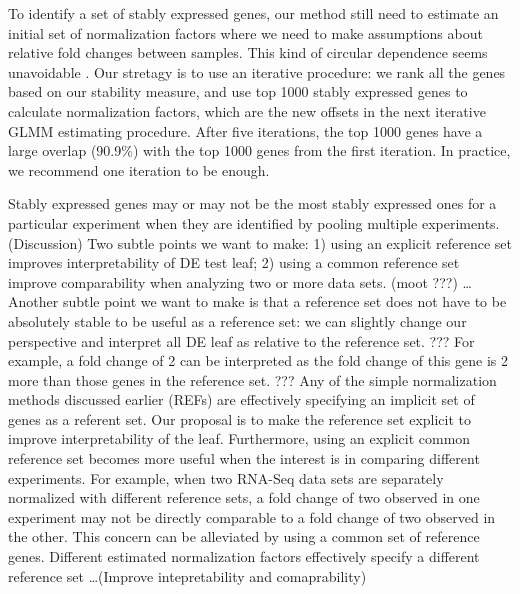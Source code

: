 \documentclass[11pt, a4paper]{article}
\begin{document}
To identify a set of stably expressed genes, our method still need to estimate an initial set of normalization factors where we need to make assumptions about relative fold changes between samples. This kind of circular dependence seems unavoidable \citep{vandesompele2002accurate}. Our stretagy is to use an iterative procedure: we rank all the genes based on our stability measure, and use top 1000 stably expressed genes to calculate normalization factors, which are the new offsets in the next iterative GLMM estimating procedure. After five iterations, the top 1000 genes have a large overlap (90.9\%) with the top 1000 genes from the first iteration. In practice, we recommend one iteration to be enough.  


Stably expressed genes may or may not be the most stably expressed ones for a
particular experiment when they are identified by pooling multiple
experiments. (Discussion) Two subtle points we want to make: 1) using an explicit reference set improves interpretability of DE test leaf; 2) using a common reference
set improve comparability when analyzing two or more data sets. (moot ???)
\dots Another subtle point we want to make is that a reference set does not
have to be absolutely stable to be useful as a reference set: we can slightly
change our perspective and interpret all DE leaf as relative to the
reference set.  ??? For example, a fold change of 2 can be interpreted as the
fold change of this gene is 2 more than those genes in the reference set. ???
Any of the simple normalization methods discussed earlier (REFs) are
effectively specifying an implicit set of genes as a referent set. Our
proposal is to make the reference set explicit to improve interpretability of
the leaf.  Furthermore, using an explicit common reference set becomes more
useful when the interest is in comparing different experiments. For example,
when two RNA-Seq data sets are separately normalized with different reference
sets, a fold change of two observed in one experiment may not be directly
comparable to a fold change of two observed in the other.  This concern can be
alleviated by using a common set of reference genes.
Different estimated normalization factors effectively specify a different
reference set \ldots (Improve intepretability and comaprability)





\end{document}
